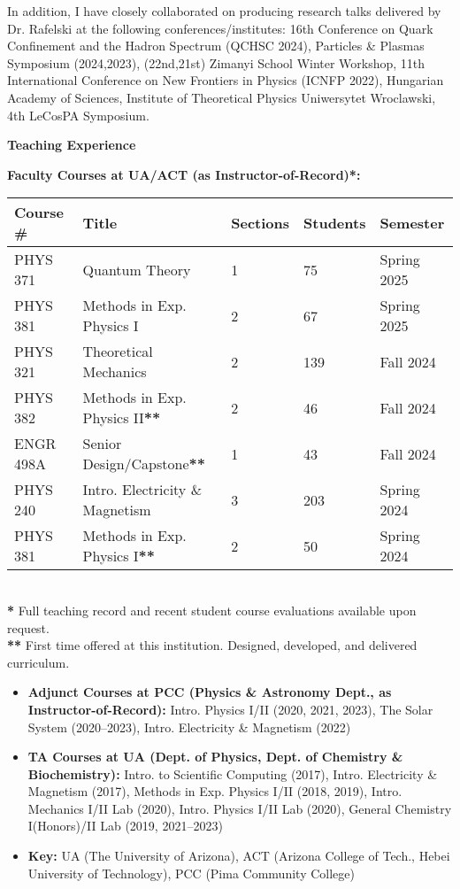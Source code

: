 \documentclass[11pt]{article}
\begin{document}
In addition, I have closely collaborated on producing research talks delivered by Dr. Rafelski at the following conferences/institutes: 16th Conference on Quark Confinement and the Hadron Spectrum (QCHSC 2024), Particles \& Plasmas Symposium (2024,2023), (22nd,21st) Zimanyi School Winter Workshop, 11th International Conference on New Frontiers in Physics (ICNFP 2022), Hungarian Academy of Sciences, Institute of Theoretical Physics Uniwersytet Wroclawski, 4th LeCosPA Symposium.

{\Large\textbf{Teaching Experience}}

\textbf{Faculty Courses at UA/ACT (as Instructor-of-Record)*:}\\
{\normalsize
\begin{tabular}{@{}p{2.5cm} p{6.5cm} p{2.0cm} p{2.0cm} p{3.0cm}@{}}
    \toprule
    \textbf{Course \#} & \textbf{Title} & \textbf{Sections} & \textbf{Students} & \textbf{Semester} \\
    \midrule
    PHYS 371   & Quantum Theory                    & 1 & 75  & Spring 2025 \\
    PHYS 381   & Methods in Exp. Physics I         & 2 & 67  & Spring 2025 \\
    PHYS 321   & Theoretical Mechanics             & 2 & 139 & Fall 2024 \\
    PHYS 382   & Methods in Exp. Physics II\textbf{**}       & 2 & 46  & Fall 2024 \\
    ENGR 498A  & Senior Design/Capstone\textbf{**}           & 1 & 43  & Fall 2024 \\
    PHYS 240   & Intro. Electricity \& Magnetism    & 3 & 203 & Spring 2024 \\
    PHYS 381   & Methods in Exp. Physics I\textbf{**}        & 2 & 50  & Spring 2024 \\
    \bottomrule
\end{tabular}
}\\[0.0em]

\textbf{*} Full teaching record and recent student course evaluations available upon request.\\[0.0em]
\textbf{**} First time offered at this institution. Designed, developed, and delivered curriculum.

\begin{itemize}[leftmargin=*,nosep]
    \item \textbf{Adjunct Courses at PCC (Physics \& Astronomy Dept., as Instructor-of-Record):} Intro. Physics I/II (2020, 2021, 2023), The Solar System (2020--2023), Intro. Electricity \& Magnetism (2022)
    \item \textbf{TA Courses at UA (Dept. of Physics, Dept. of Chemistry \& Biochemistry):} Intro. to Scientific Computing (2017), Intro. Electricity \& Magnetism (2017), Methods in Exp. Physics I/II (2018, 2019), Intro. Mechanics I/II Lab (2020), Intro. Physics I/II Lab (2020), General Chemistry I(Honors)/II Lab (2019, 2021--2023)
    \item \textbf{Key:} UA (The University of Arizona), ACT (Arizona College of Tech., Hebei University of Technology), PCC (Pima Community College)
\end{itemize}
\end{document}
